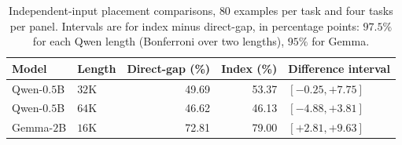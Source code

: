 \begin{table}[ht]
\centering\small
\caption{Independent-input placement comparisons, $80$ examples per task and four tasks per panel. Intervals are for index minus direct-gap, in percentage points: $97.5\%$ for each Qwen length (Bonferroni over two lengths), $95\%$ for Gemma.}
\label{tab:coordinate-confirmation}
\begin{tabular}{@{}llrrl@{}}
\toprule
Model & Length & Direct-gap (\%) & Index (\%) & Difference interval\\
\midrule
Qwen-$0.5$B & $32$K & 49.69 & 53.37 & $[-0.25,+7.75]$ \\
Qwen-$0.5$B & $64$K & 46.62 & 46.13 & $[-4.88,+3.81]$ \\
Gemma-$2$B & $16$K & 72.81 & 79.00 & $[+2.81,+9.63]$ \\
\bottomrule
\end{tabular}
\end{table}
